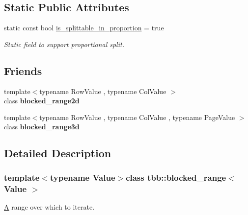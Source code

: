 \subsection*{Static Public Attributes}
\begin{DoxyCompactItemize}
\item 
\hypertarget{classtbb_1_1blocked__range_ae2b0210e2468092b408123adeb54b01c}{}static const bool \hyperlink{classtbb_1_1blocked__range_ae2b0210e2468092b408123adeb54b01c}{is\+\_\+splittable\+\_\+in\+\_\+proportion} = true\label{classtbb_1_1blocked__range_ae2b0210e2468092b408123adeb54b01c}

\begin{DoxyCompactList}\small\item\em Static field to support proportional split. \end{DoxyCompactList}\end{DoxyCompactItemize}
\subsection*{Friends}
\begin{DoxyCompactItemize}
\item 
\hypertarget{classtbb_1_1blocked__range_aa504612e6c1ba07b8846bcd323847680}{}{\footnotesize template$<$typename Row\+Value , typename Col\+Value $>$ }\\class {\bfseries blocked\+\_\+range2d}\label{classtbb_1_1blocked__range_aa504612e6c1ba07b8846bcd323847680}

\item 
\hypertarget{classtbb_1_1blocked__range_a83f67fe3b421dbaeee9040aae730d5e8}{}{\footnotesize template$<$typename Row\+Value , typename Col\+Value , typename Page\+Value $>$ }\\class {\bfseries blocked\+\_\+range3d}\label{classtbb_1_1blocked__range_a83f67fe3b421dbaeee9040aae730d5e8}

\end{DoxyCompactItemize}


\subsection{Detailed Description}
\subsubsection*{template$<$typename Value$>$class tbb\+::blocked\+\_\+range$<$ Value $>$}

\hyperlink{structA}{A} range over which to iterate. 



